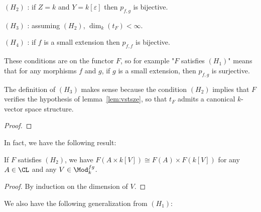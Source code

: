 \begin{definition}
  \label{def:H2}
  \leanok
  $(H_2)$ : if $Z = k$ and $Y = k[\varepsilon]$ then $p_{f, g}$ is bijective.
\end{definition}

\begin{definition}
  \label{def:H3}
  \leanok
  $(H_3)$ : assuming $(H_2)$, $\dim_k (t_F) < \infty$.
\end{definition}

\begin{definition}
  \label{def:H4}
  \leanok
  $(H_4)$ : if $f$ is a small extension then $p_{f, f}$ is bijective.
\end{definition}

These conditions are on the functor $F$, so for example "$F$ satisfies
$(H_1)$" means that for any morphisms $f$ and $g$, if $g$ is a
small extension, then $p_{f, g}$ is surjective.

\begin{lemma}
  \label{lem:vsh2}
  \leanok
  The definition of $(H_3)$ makes sense because the condition $(H_2)$ implies
  that $F$ verifies the hypothesis of lemma~\ref{lem:vstsze}, so that
  $t_F$ admits a canonical $k$-vector space structure.
\end{lemma}

\begin{proof}
  \leanok
\end{proof}

In fact, we have the
following result:

\begin{lemma}
  \label{lem:h2+}
  \leanok
  If $F$ satisfies $(H_2)$, we have
  $F(A \times k[V]) \cong F(A) \times F(k[V])$
  for any $A \in \CL$ and any $V \in \Mod_k^{fg}$.
\end{lemma}

\begin{proof}
  \leanok
  By induction on the dimension of $V$.
\end{proof}

We also have the following generalization from $(H_1)$:

